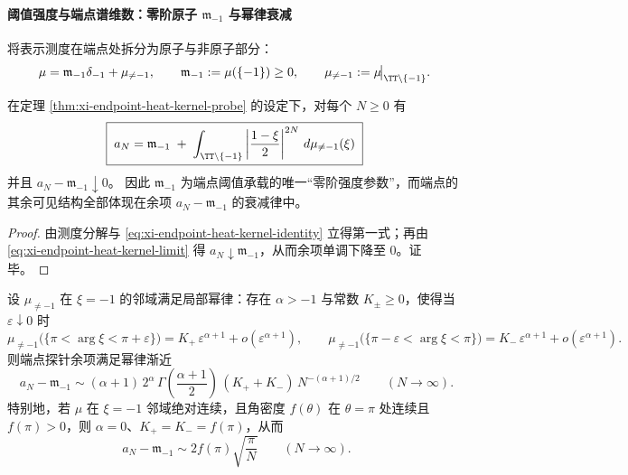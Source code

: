 \paragraph{阈值强度与端点谱维数：零阶原子 \texorpdfstring{$\mathfrak m_{-1}$}{m(-1)} 与幂律衰减}
将表示测度在端点处拆分为原子与非原子部分：
\[
\mu=\mathfrak m_{-1}\delta_{-1}+\mu_{\neq -1},
\qquad
\mathfrak m_{-1}:=\mu(\{-1\})\ge 0,
\qquad
\mu_{\neq -1}:=\mu\!\big|_{\TT\setminus\{-1\}}.
\]

\begin{corollary}[原子部分的严格分离]\label{cor:xi-endpoint-atom-separation}
在定理 \ref{thm:xi-endpoint-heat-kernel-probe} 的设定下，对每个 \(N\ge 0\) 有
\[
\boxed{\;
a_N
=\mathfrak m_{-1}
\;+\;
\int_{\TT\setminus\{-1\}}\left|\frac{1-\xi}{2}\right|^{2N}\,d\mu_{\neq -1}(\xi)\;}
\]
并且 \(a_N-\mathfrak m_{-1}\downarrow 0\)。
因此 \(\mathfrak m_{-1}\) 为端点阈值承载的唯一“零阶强度参数”，而端点的其余可见结构全部体现在余项 \(a_N-\mathfrak m_{-1}\) 的衰减律中。
\end{corollary}

\begin{proof}
由测度分解与 \eqref{eq:xi-endpoint-heat-kernel-identity} 立得第一式；再由 \eqref{eq:xi-endpoint-heat-kernel-limit} 得 \(a_N\downarrow \mathfrak m_{-1}\)，从而余项单调下降至 \(0\)。证毕。
\end{proof}

\begin{theorem}\label{thm:xi-endpoint-spectral-dimension-laplace}
设 \(\mu_{\neq -1}\) 在 \(\xi=-1\) 的邻域满足局部幂律：存在 \(\alpha>-1\) 与常数 \(K_\pm\ge 0\)，使得当 \(\varepsilon\downarrow 0\) 时
\[
\mu_{\neq -1}\bigl(\{\pi<\arg\xi<\pi+\varepsilon\}\bigr)
=K_+\,\varepsilon^{\alpha+1}+o(\varepsilon^{\alpha+1}),
\qquad
\mu_{\neq -1}\bigl(\{\pi-\varepsilon<\arg\xi<\pi\}\bigr)
=K_-\,\varepsilon^{\alpha+1}+o(\varepsilon^{\alpha+1}).
\]
则端点探针余项满足幂律渐近
\begin{equation}\label{eq:xi-endpoint-laplace-asymptotic}
\boxed{\;
a_N-\mathfrak m_{-1}
\sim
(\alpha+1)\,2^{\alpha}\,
\Gamma\!\left(\frac{\alpha+1}{2}\right)\,
(K_++K_-)\,N^{-(\alpha+1)/2}\qquad(N\to\infty).}
\end{equation}
特别地，若 \(\mu\) 在 \(\xi=-1\) 邻域绝对连续，且角密度 \(f(\theta)\) 在 \(\theta=\pi\) 处连续且 \(f(\pi)>0\)，则 \(\alpha=0\)、\(K_+=K_-=f(\pi)\)，从而
\[
\boxed{\;
a_N-\mathfrak m_{-1}\sim 2f(\pi)\sqrt{\frac{\pi}{N}}\qquad(N\to\infty).}
\]
\end{theorem}

